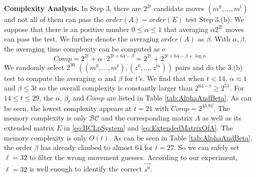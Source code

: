\noindent\textbf{Complexity Analysis. }
In Step 3, there are $2^{2t}$ candidate moves $(m^0,\ldots, m^{t})$ and not all of them can pass the $order(A)=order(E)$ test Step 3.(b).
We suppose that there is an positive number $0\leq \alpha \leq 1$ that averaging $\alpha  2^{2t}$ moves can pass the test.
We further denote the averaging $order(A)$ as $\beta $.
With $\alpha ,\beta $, the averaging time complexity can be computed as e
\begin{equation}\label{eq:Complexity}
  Comp=2^{2t}+\alpha \cdot 2^{2t+64-\beta }=2^{2t}+2^{2t+64-\beta +\log\alpha }
\end{equation}
We randomly select $2^{30}$ $((m^0,\ldots, m^t), (z^0,\ldots, z^m))$ pairs and do the 3.(b) test to compute the averaging $\alpha$ and $\beta$ for $t$'s.
We find that when $t<14$, $\alpha \approx 1$ and $\beta\leq 3t$ so the overall complexity is constantly larger than $2^{64-t}\geq 2^{51}$.
For $14\leq t\leq 29$, the $\alpha$, $\beta_t$ and $Comp$ are listed in Table \ref{tab:AlphaAndBeta}.
As can be seen, the lowest complexity appears at $t=21$ with $Comp=2^{43.91}$.
The memory complexity is only $\mathcal{BC}$ and the corresponding matrix $A$ as well as its extended matrix $E$ in \eqref{eq:BCLpSystem} and \eqref{eq:ExtendedMatrixOfA}.
The memory complexity is only $O(t)$.
As can be seen in Table \ref{tab:AlphaAndBeta}, the order $\beta$ has already climbed to almost 64 for $t=27$.
So we can safely set $\ell=32$ to filter the wrong movement guesses.
According to our experiment, $\ell=32$ is well enough to identify the correct $\vec{s^0}$.




